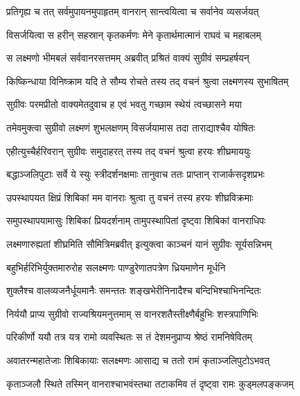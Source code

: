 
\twolineshloka
{प्रतिगृह्य च तत् सर्वमुपायनमुपाहृतम्}
{वानरान् सान्त्वयित्वा च सर्वानेव व्यसर्जयत्} %

\twolineshloka
{विसर्जयित्वा स हरीन् सहस्रान् कृतकर्मणः}
{मेने कृतार्थमात्मानं राघवं च महाबलम्} %

\twolineshloka
{स लक्ष्मणो भीमबलं सर्ववानरसत्तमम्}
{अब्रवीत् प्रश्रितं वाक्यं सुग्रीवं सम्प्रहर्षयन्} %

\twolineshloka
{किष्किन्धाया विनिष्क्राम यदि ते सौम्य रोचते}
{तस्य तद् वचनं श्रुत्वा लक्ष्मणस्य सुभाषितम्} %

\twolineshloka
{सुग्रीवः परमप्रीतो वाक्यमेतदुवाच ह}
{एवं भवतु गच्छाम स्थेयं त्वच्छासने मया} %

\twolineshloka
{तमेवमुक्त्वा सुग्रीवो लक्ष्मणं शुभलक्षणम्}
{विसर्जयामास तदा ताराद्याश्चैव योषितः} %

\twolineshloka
{एहीत्युच्चैर्हरिवरान् सुग्रीवः समुदाहरत्}
{तस्य तद् वचनं श्रुत्वा हरयः शीघ्रमाययुः} %

\twolineshloka
{बद्धाञ्जलिपुटाः सर्वे ये स्युः स्त्रीदर्शनक्षमाः}
{तानुवाच ततः प्राप्तान् राजार्कसदृशप्रभः} %

\twolineshloka
{उपस्थापयत क्षिप्रं शिबिकां मम वानराः}
{श्रुत्वा तु वचनं तस्य हरयः शीघ्रविक्रमाः} %

\twolineshloka
{समुपस्थापयामासुः शिबिकां प्रियदर्शनाम्}
{तामुपस्थापितां दृष्ट्वा शिबिकां वानराधिपः} %

\twolineshloka
{लक्ष्मणारुह्यतां शीघ्रमिति सौमित्रिमब्रवीत्}
{इत्युक्त्वा काञ्चनं यानं सुग्रीवः सूर्यसन्निभम्} %

\twolineshloka
{बहुभिर्हरिभिर्युक्तमारुरोह सलक्ष्मणः}
{पाण्डुरेणातपत्रेण ध्रियमाणेन मूर्धनि} %

\twolineshloka
{शुक्लैश्च वालव्यजनैर्धूयमानैः समन्ततः}
{शङ्खभेरीनिनादैश्च बन्दिभिश्चाभिनन्दितः} %

\twolineshloka
{निर्ययौ प्राप्य सुग्रीवो राज्यश्रियमनुत्तमाम्}
{स वानरशतैस्तीक्ष्णैर्बहुभिः शस्त्रपाणिभिः} %

\twolineshloka
{परिकीर्णो ययौ तत्र यत्र रामो व्यवस्थितः}
{स तं देशमनुप्राप्य श्रेष्ठं रामनिषेवितम्} %

\twolineshloka
{अवातरन्महातेजाः शिबिकायाः सलक्ष्मणः}
{आसाद्य च ततो रामं कृताञ्जलिपुटोऽभवत्} %

\twolineshloka
{कृताञ्जलौ स्थिते तस्मिन् वानराश्चाभवंस्तथा}
{तटाकमिव तं दृष्ट्वा रामः कुड्मलपङ्कजम्} %

